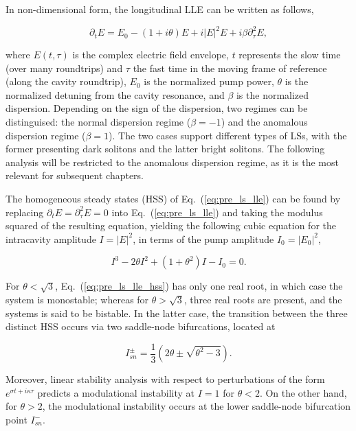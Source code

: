 In non-dimensional form, the longitudinal LLE can be written as follows,

\begin{equation}
    \partial_t E = E_0 -(1 + i\theta)E + i |E|^2 E + i\beta \partial_{\tau}^2 E,
    \label{eq:pre_ls_lle}
\end{equation}

\noindent where $E(t, \tau)$ is the complex electric field envelope, $t$ represents the slow time (over many roundtrips)
and $\tau$ the fast time in the moving frame of reference (along the cavity roundtrip), $E_0$ is the normalized pump power, $\theta$ is the normalized
detuning from the cavity resonance, and $\beta$ is the normalized dispersion. Depending on the sign of the dispersion,
two regimes can be distinguised: the normal dispersion regime ($\beta = - 1$) and the anomalous dispersion regime ($\beta = 1$).
The two cases support different types of LSs, with the former presenting dark solitons and the latter bright solitons.
The following analysis will be restricted to the anomalous dispersion regime, as it is the most relevant for subsequent
chapters.

The homogeneous steady states (HSS) of Eq.~(\ref{eq:pre_ls_lle}) can be found by replacing $\partial_t E = \partial_{\tau}^2 E = 0$
into Eq.~(\ref{eq:pre_ls_lle}) and taking the modulus squared of the resulting equation, 
yielding the following cubic equation for the intracavity amplitude $I = |E|^2$,
in terms of the pump amplitude $I_0 = |E_0|^2$,

\begin{equation}
    I^3 - 2\theta I^2 + (1 + \theta^2)I - I_0 = 0.
    \label{eq:pre_ls_lle_hss}
\end{equation}

For $\theta < \sqrt{3}$, Eq.~(\ref{eq:pre_ls_lle_hss}) has only one real root, in which case the system is monostable; whereas
for $\theta > \sqrt{3}$, three real roots are present, and the systems is said to be bistable. In the latter case, the
transition between the three distinct HSS occurs via two saddle-node bifurcations, located at

\begin{equation}
    I_{sn}^{\pm} = \dfrac{1}{3} \left(2\theta \pm \sqrt{\theta^2 - 3}\right).
    \label{eq:pre_ls_lle_sn}
\end{equation}

Moreover, linear stability analysis
with respect to perturbations of the form $e^{\sigma t + i\kappa \tau}$ predicts a modulational instability at $I = 1$
for $\theta < 2$. On the other hand, for $\theta > 2$, the modulational instability occurs at the lower saddle-node
bifurcation point $I_{sn}^-$.

